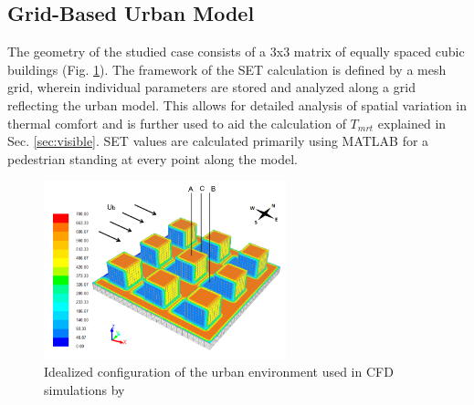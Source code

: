 \documentclass[smallextended]{svjour3}
\begin{document}
\subsection{Grid-Based Urban Model}
\label{sec:gridModel}
The geometry of the studied case consists of a 3x3 matrix of equally spaced cubic buildings (Fig. \ref{Fig.IdealUrban}). The framework of the SET calculation is defined by a mesh grid, wherein individual parameters are stored and analyzed along a grid reflecting the urban model. This allows for detailed analysis of spatial variation in thermal comfort and is further used to aid the calculation of $T_{mrt}$  explained in Sec. \ref{sec:visible}. SET values are calculated primarily using MATLAB for a pedestrian standing at every point along the model.  

\begin {figure}[!h]
\graphicspath{ {image/} }
\includegraphics[width=7cm]{ThermalEnvironmentModel.PNG}
\centering
\caption{Idealized configuration of the urban environment used in CFD simulations by \citet{nazarian2014effects}}
\label{Fig.IdealUrban}
\end {figure}

\end{document}
